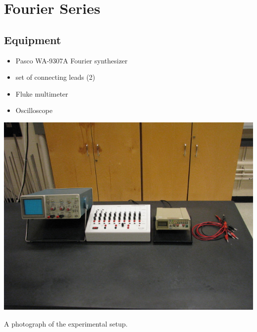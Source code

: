




\chapter{Fourier Series}

\section{Equipment}

\begin{minipage}[t]{0.7\textwidth}
\begin{itemize}[noitemsep]
\item Pasco WA-9307A Fourier synthesizer
\item set of connecting leads (2)
\end{itemize}
\end{minipage}
\begin{minipage}[t]{0.3\textwidth}
\begin{itemize}[noitemsep]
\item Fluke multimeter
\item Oscilloscope
\end{itemize}
\end{minipage}


\begin{marginfigure}[+1in]
\includegraphics{Fourier-Series-Setup.jpg}
\caption{A photograph of the experimental setup.}
\label{fig:FSsetup}
\end{marginfigure}


